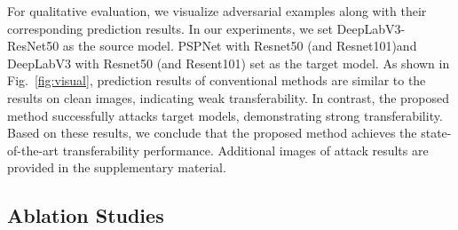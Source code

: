 For qualitative evaluation, we visualize adversarial examples along with their corresponding prediction results. In our experiments, we set DeepLabV3-ResNet50 as the source model. PSPNet with Resnet50 (and Resnet101)and DeepLabV3 with Resnet50 (and Resent101) set as the target model. As shown in Fig.~\ref{fig:visual}, prediction results of conventional methods are similar to the results on clean images, indicating weak transferability. In contrast, the proposed method successfully attacks target models, demonstrating strong transferability. Based on these results, we conclude that the proposed method achieves the state-of-the-art transferability performance. Additional images of attack results are provided in the supplementary material. 
\subsection{Ablation Studies}


